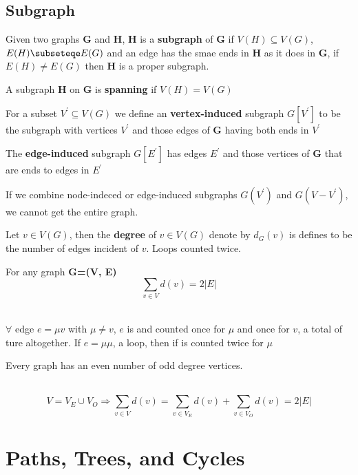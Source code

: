 	\section{Subgraph}
		Given two graphs \textbf{G} and \textbf{H}, \textbf{H} is a \textbf{subgraph} of \textbf{G} if $V(H)\subseteq V(G)$, $E(H)\subseteqe E(G)$ and an edge has the smae ends in \textbf{H} as it does in \textbf{G}, if $E(H)\neq E(G)$ then \textbf{H} is a proper subgraph.

		A subgraph \textbf{H} on \textbf{G} is \textbf{spanning} if $V(H) = V(G)$

		For a subset $V^{'}\subseteq V(G)$ we define an \textbf{vertex-induced} subgraph $G[V^{'}]$ to be the subgraph with vertices $V^{'}$ and those edges of \textbf{G} having both ends in $V^{'}$

		The \textbf{edge-induced} subgraph $G[E^{'}]$ has edges $E^{'}$ and those vertices of \textbf{G} that are ends to edges in \textbf{$E^{'}$}

		If we combine node-indeced or edge-induced subgraphs $G(V^{'})$ and $G(V - V^{'})$, we cannot get the entire graph.

		Let $v\in V(G)$, then the \textbf{degree} of $v\in V(G)$ denote by $d_G(v)$ is defines to be the number of edges incident of $v$. Loops counted twice.

		 For any graph \textbf{G=(V, E)}
		\begin{equation}
			\sum_{v\in V}d(v) = 2|E|
		\end{equation}

		\\
		$\forall$ edge $e=\mu v$ with $\mu \neq v$, $e$ is  and counted once for $\mu$ and once for $v$, a total of ture altogether. If $e=\mu \mu$, a loop, then if is counted twice for $\mu$

		 Every graph has an even number of odd degree vertices.

		\\
		\begin{equation}
			V = V_E\cup V_O \Rightarrow 
			\sum_{v\in V}d(v) = \sum_{v\in V_E} d(v) + \sum_{v\in V_O}d(v) = 2|E|
		\end{equation}

	\chapter{Paths, Trees, and Cycles}

